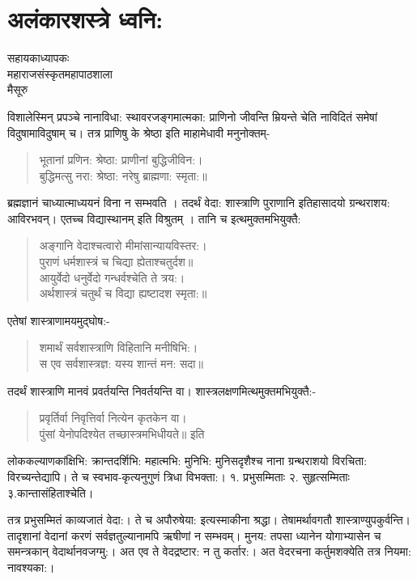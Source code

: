 {\fontsize{15}{17}\selectfont
\chapter{अलंकारशस्त्रे ध्वनि:}

\begin{center}
\smallskip
सहायकाध्यापकः\\
महाराजसंस्कृतमहापाठशाला\\
मैसूरु
\addrule
\end{center}
विशालेस्मिन् प्रपञ्चे नानाविधा: स्थावरजङ्गमात्मका: प्राणिनो जीवन्ति म्रियन्ते चेति नाविदितं समेषां विदुषामाविदुषाम् च। तत्र प्राणिषु के श्रेष्ठा इति माहामेधावी मनुनोक्तम्-
\begin{verse}
भूतानां प्रणिन: श्रेष्ठा: प्राणीनां बुद्धिजीविन:।\\
बुद्धिमत्सु नरा: श्रेष्ठा: नरेषु ब्राह्मणा: स्मृता:॥
\end{verse}
ब्रह्मज्ञानं चाध्यात्माध्ययनं विना न सम्भवति । तदर्थं वेदा: शास्त्राणि पुराणानि इतिहासादयो ग्रन्थराशय: आविरभवन्। एतच्च विद्यास्थानम् इति विश्रुतम् । तानि च इत्थमुक्तमभियुक्तै: 
\begin{verse}
अङ्गानि वेदाश्चत्वारो मीमांसान्यायविस्तर:।\\
पुराणं धर्मशास्त्रं च चिद्या ह्येताश्चतुर्दश॥\\
आयुर्वेदो धनुर्वेदो गन्धर्वश्चेति ते त्रय:।\\
अर्थशास्त्रं चतुर्थं च विद्या ह्यष्टादश स्मृता:॥
\end{verse}
एतेषां शास्त्राणामयमुद्घोष:-
\begin{verse}
शमार्थं सर्वशास्त्राणि विहितानि मनीषिभि:।\\
स एव सर्वशास्त्रज्ञ: यस्य शान्तं मन: सदा॥
\end{verse}
तदर्थं शास्त्राणि मानवं प्रवर्तयन्ति निवर्तयन्ति वा। शास्त्रलक्षणमित्थमुक्तमभियुक्तै:-
\begin{verse}
प्रवृर्तिर्वा निवृत्तिर्वा नित्येन कृतकेन वा।\\
पुंसां येनोपदिश्येत तच्छास्त्रमभिधीयते॥ इति
\end{verse}
लोककल्याणकांक्षिभि: क्रान्तदर्शिभि: महात्मभि: मुनिभि: मुनिसदृशैश्च नाना ग्रन्थराशयो विरचिता: विरच्यन्तेद्यापि। ते च स्वभाव-कृत्यनुगुणं त्रिधा विभक्ता:। १. प्रभुसम्मिताः   २. सुहृत्सम्मिताः  ३.कान्तासंहिताश्चेति।

तत्र प्रभुसम्मितं काव्यजातं वेदा:। ते च अपौरुषेया: इत्यस्माकीना श्रद्धा। तेषामर्थावगतौ शास्त्राण्युपकुर्वन्ति। तादृशानां वेदानां करणं सर्वज्ञतुल्यानामपि ऋषीणां न सम्भवम्। मुनय: तपसा ध्यानेन योगाभ्यासेन च समन्त्रकान् वेदार्थानवजग्मु:। अत एव ते वेदद्रष्टार: न तु कर्तार:। अत वेदरचना कर्तुमशक्येति तत्र नियमा: नावश्यका:।

}
